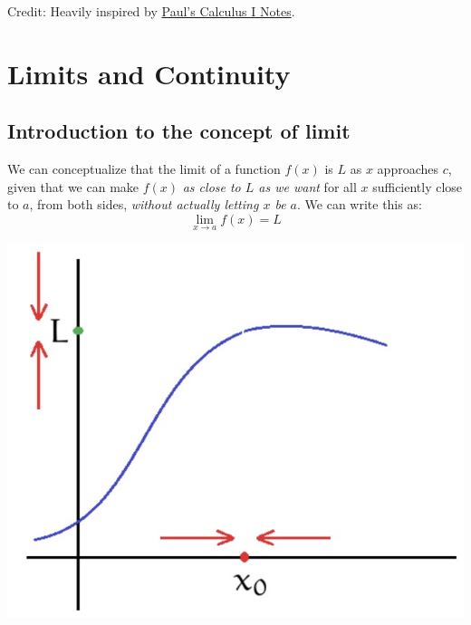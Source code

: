 \documentclass{article}
\begin{document}



\begin{center}
  Credit: Heavily inspired by \href{https://tutorial.math.lamar.edu/Classes/CalcI/CalcI.aspx}{Paul's Calculus I Notes}.
\end{center}

\section{Limits and Continuity}

\subsection{Introduction to the concept of limit}
\begin{minipage}{0.65\textwidth}
  We can conceptualize that the limit of a function $f(x)$ is $L$ as $x$ approaches $c$, given that we can make $f(x)$ \emph{as close to $L$ as we want} for all $x$ sufficiently close to $a$, from both sides, \emph{without actually letting $x$ be $a$}. We can write this as:
  \[\lim_{x\to a}f(x)=L\]
\end{minipage}
\hfill
\begin{minipage}{0.3\textwidth}
  \includegraphics[width=\textwidth]{img/Lim.jpg}
\end{minipage}
\end{document}
